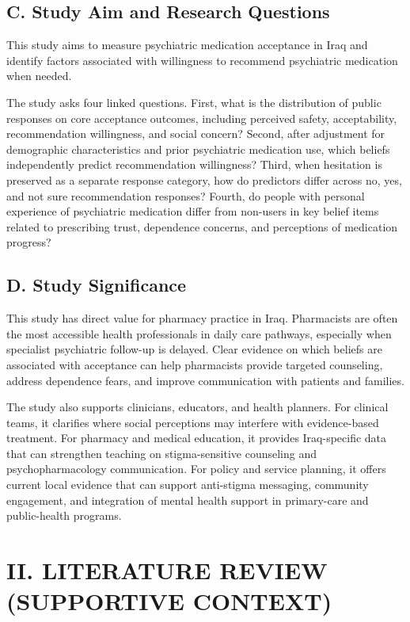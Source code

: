 \documentclass[12pt,a4paper]{article}
\begin{document}
\subsection*{C. Study Aim and Research Questions}
This study aims to measure psychiatric medication acceptance in Iraq and identify factors associated with willingness to recommend psychiatric medication when needed.

The study asks four linked questions. First, what is the distribution of public responses on core acceptance outcomes, including perceived safety, acceptability, recommendation willingness, and social concern? Second, after adjustment for demographic characteristics and prior psychiatric medication use, which beliefs independently predict recommendation willingness? Third, when hesitation is preserved as a separate response category, how do predictors differ across no, yes, and not sure recommendation responses? Fourth, do people with personal experience of psychiatric medication differ from non-users in key belief items related to prescribing trust, dependence concerns, and perceptions of medication progress?

\subsection*{D. Study Significance}
This study has direct value for pharmacy practice in Iraq. Pharmacists are often the most accessible health professionals in daily care pathways, especially when specialist psychiatric follow-up is delayed. Clear evidence on which beliefs are associated with acceptance can help pharmacists provide targeted counseling, address dependence fears, and improve communication with patients and families.

The study also supports clinicians, educators, and health planners. For clinical teams, it clarifies where social perceptions may interfere with evidence-based treatment. For pharmacy and medical education, it provides Iraq-specific data that can strengthen teaching on stigma-sensitive counseling and psychopharmacology communication. For policy and service planning, it offers current local evidence that can support anti-stigma messaging, community engagement, and integration of mental health support in primary-care and public-health programs.

\newpage
\section*{II. LITERATURE REVIEW (SUPPORTIVE CONTEXT)}
\end{document}
